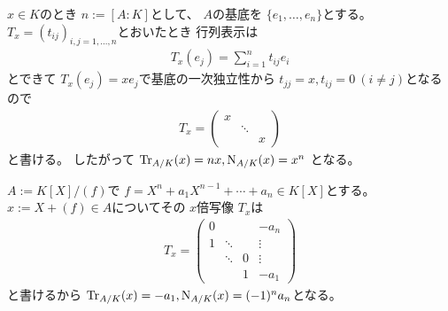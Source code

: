 \documentclass[../master_galois_theory]{subfiles}
\begin{document}
\begin{exam}
  $x \in K$のとき $n := [A:K]$として、
  $A$の基底を $\{ e_1 , \dots , e_n \}$とする。
  $T_x = (t_{ij})_{i,j = 1 , \dots , n}$とおいたとき
  行列表示は
  \begin{eqnarray*}
    T_x (e_j) = \sum_{i=1}^n t_{ij} e_i
  \end{eqnarray*}
  とできて $T_x (e_j) = xe_j$で基底の一次独立性から
  $t_{jj} = x , t_{ij} = 0 \  (i \neq j)$となるので
  \begin{eqnarray*}
    T_x =
    \begin{pmatrix}
      x &        &   \\
        & \ddots &  \\
        &        &  x
    \end{pmatrix}
  \end{eqnarray*}
  と書ける。
  したがって
  $\mathrm{Tr}_{A/K}(x) = nx , \mathrm{N}_{A/K}(x) = x^n$
  となる。
\end{exam}

\begin{exam}
  $A := K[X]/(f)$で $f = X^n + a_1 X^{n-1} + \cdots + a_n \in K[X]$とする。
  $x := X + (f) \in A$についてその $x$倍写像 $T_x$は
  \begin{eqnarray*}
    T_x =
    \begin{pmatrix}
      0 &        &   & - a_n \\
      1 & \ddots &   & \vdots \\
        & \ddots & 0 & \vdots \\
        &        & 1 & - a_1
    \end{pmatrix}
  \end{eqnarray*}
  と書けるから
  $\mathrm{Tr}_{A/K}(x) = -a_1 , \mathrm{N}_{A/K}(x) = (-1)^n a_n$となる。
\end{exam}
\end{document}
